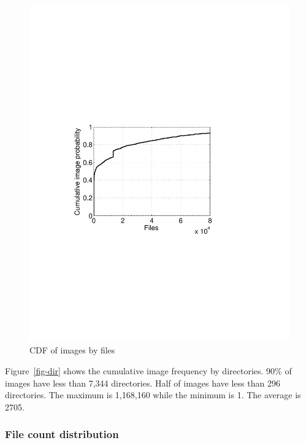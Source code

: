 \begin{figure}
\begin{minipage}{0.24\textwidth}
		\includegraphics[width=1\textwidth]{graphs/file.pdf}
		\caption{CDF of images by files}
		\label{fig-file}
	\end{minipage}
\end{figure}

Figure~\ref{fig-dir} shows the cumulative image frequency by directories. 90\% of images have less than 7,344 directories. Half of images have less than 296 directories. The maximum is 1,168,160 while the minimum is 1. The average is 2705. 

\subsubsection{File count distribution}

